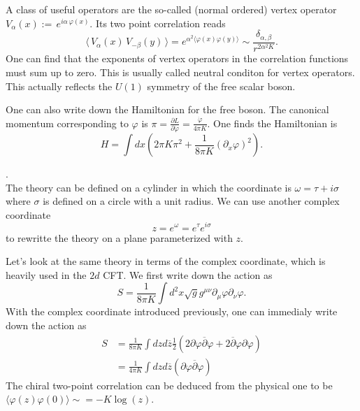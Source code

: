 \documentclass[submission, PhysLectNotes]{SciPost}
\begin{document}
A class of useful operators are the so-called (normal ordered) vertex operator $V_{\alpha}(x) := \, e^{i\alpha\,\varphi(x)}$. Its two point correlation reads
\begin{equation}
	\langle\, V_\alpha(x)\, V_{-\beta}(y)\, \rangle = e^ {\alpha^2 \langle \varphi(x) \varphi(y) \rangle} \sim \frac{\delta_{\alpha,\beta}}{r^{2\alpha^2 K}}.
\end{equation}
One can find that the exponents of vertex operators in the correlation functions must sum up to zero. This is usually called neutral conditon for vertex operators. This actually reflects the $U(1)$ symmetry of the free scalar boson. 

One can also write down the Hamiltonian for the free boson. The canonical momentum corresponding to $\varphi$ is $\pi = \frac{\partial L}  {\partial \dot\varphi} = \frac{\dot{\varphi}}{4\pi K}$. One finds the Hamiltonian is 
\begin{equation}
	H = \int dx \left( 2\pi K \pi^2 + \frac{1}{8\pi K} {\left(\partial_x \varphi\right)}^2 \right).
\end{equation}

. \\
The theory can be defined on a cylinder in which the coordinate is $\omega = \tau + i\sigma$ where $\sigma$ is defined on a circle with a unit radius. We can use another complex coordinate
\begin{equation}
  z = e^\omega = e^\tau e^{i\sigma}
\end{equation}
to rewritte the theory on a plane parameterized with $z$.

Let's look at the same theory in terms of the complex coordinate, which is heavily used in the $2d$ CFT\@. We first write down the action as
\begin{equation}
	S = \frac{1}{8\pi K}\int d^2 x \sqrt{g} g^{\mu \nu} \partial_\mu \varphi \partial_\nu \varphi.  
\end{equation} 
With the complex coordinate introduced previously, one can immedialy write down the action as
\begin{equation}
	\begin{aligned}
		S &= \frac{1}{8\pi K}\int dz d\overline{z} \frac{1}{2} \left( 2 \partial \varphi \overline{\partial} \varphi + 2 \overline{\partial} \varphi \partial \varphi \right) \\
		&= \frac{1}{4\pi K}\int dz d\overline{z} \left( \partial \varphi \overline{\partial} \varphi \right)
	\end{aligned}
\end{equation}
The chiral two-point correlation can be deduced from the physical one to be $\langle \varphi(z) \varphi(0) \rangle \sim = -K \log(z) $.
\end{document}
